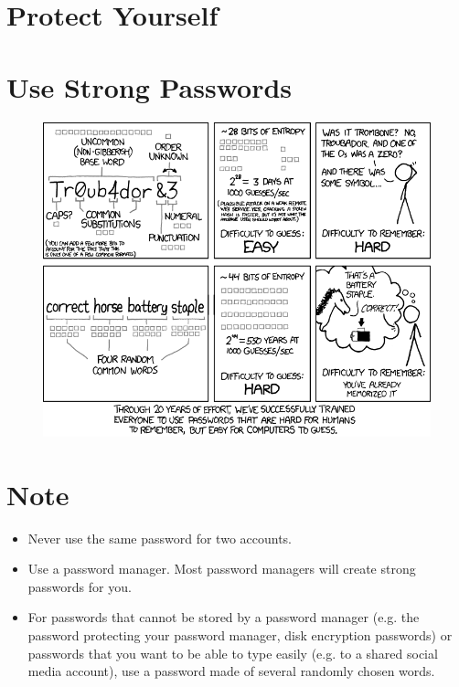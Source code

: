 \documentclass[12pt, oneside]{book}
\begin{document}
	\frontmatter
	\section*{\Huge \center Protect Yourself}
	\section*{\Large \center Use Strong Passwords}
	\begin{figure}[h]
		\centering  
		\includegraphics[scale=0.45]{password_strength.png}
	\end{figure}
	
	\mainmatter
	\centering
	\section*{Note}
	\begin{itemize}
		\item Never use the same password for two accounts.\\
		\item Use a password manager.  Most password managers will create strong
		passwords for you.\\
		\item For passwords that cannot be stored by a password manager (e.g. the
		password protecting your password manager, disk encryption passwords) or
		passwords that you want to be able to type easily (e.g. to a shared
		social media account), use a password made of several randomly chosen words.\\
	\end{itemize}
	\pagebreak
\end{document}
